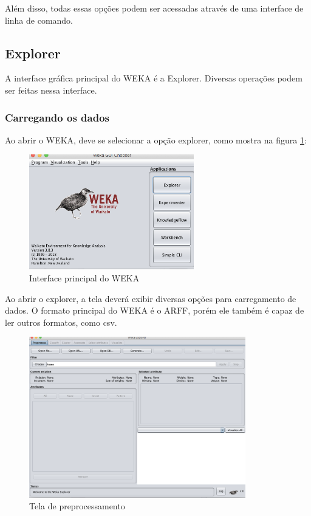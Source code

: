 Além disso, todas essas opções podem ser acessadas através de uma interface de linha de comando.

\subsection{Explorer}
A interface gráfica principal do WEKA é a Explorer. Diversas operações podem ser feitas nessa interface.

\subsubsection{Carregando os dados}
Ao abrir o WEKA, deve se selecionar a opção explorer, como mostra na figura \ref{explorer}:

\begin{figure}[H]
\centering
\includegraphics[height=5cm]{imagens/wekaprincipal.png}
\caption{Interface principal do WEKA}
\label{explorer}
\end{figure}

Ao abrir o explorer, a tela deverá exibir diversas opções para carregamento de dados. O formato principal do WEKA é o ARFF, porém ele também é capaz de ler outros formatos, como csv.

\begin{figure}[H]
\centering
\includegraphics[height=7cm]{imagens/wekapreprocessempty.png}
\caption{Tela de preprocessamento}
\label{figura19}
\end{figure}

